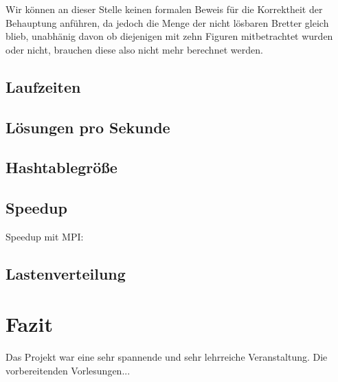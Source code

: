\documentclass[
	12pt,
	a4paper,
	BCOR10mm,
	DIV14,
	listof=totoc,
	bibliography=totoc,
	headsepline
]{scrreprt}
\begin{document}
Wir können an dieser Stelle keinen formalen Beweis für die Korrektheit der Behauptung anführen, da jedoch die Menge der nicht lösbaren Bretter gleich blieb, unabhänig davon ob diejenigen mit zehn Figuren mitbetrachtet wurden oder nicht, brauchen diese also nicht mehr berechnet werden. 

\section{Laufzeiten}

\section{Lösungen pro Sekunde}

\section{Hashtablegröße}

\section{Speedup}

Speedup mit MPI: 



\section{Lastenverteilung}


\chapter{Fazit}
\label{Fazit}

Das Projekt war eine sehr spannende und sehr lehrreiche Veranstaltung. Die vorbereitenden Vorlesungen...
\end{document}
